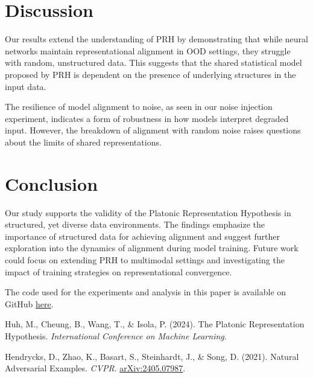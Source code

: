 \documentclass[10pt,a4paper]{article}
\begin{document}
\section{Discussion}
Our results extend the understanding of PRH by demonstrating that while neural networks maintain representational alignment in OOD settings, they struggle with random, unstructured data. This suggests that the shared statistical model proposed by PRH is dependent on the presence of underlying structures in the input data.

The resilience of model alignment to noise, as seen in our noise injection experiment, indicates a form of robustness in how models interpret degraded input. However, the breakdown of alignment with random noise raises questions about the limits of shared representations.



\section{Conclusion}
Our study supports the validity of the Platonic Representation Hypothesis in structured, yet diverse data environments. The findings emphasize the importance of structured data for achieving alignment and suggest further exploration into the dynamics of alignment during model training. Future work could focus on extending PRH to multimodal settings and investigating the impact of training strategies on representational convergence.

\vfill
The code used for the experiments and analysis in this paper is available on GitHub \href{https://github.com/rokosbasilisk/prh-experiments}{here}.

\clearpage
\begin{thebibliography}{9}

Huh, M., Cheung, B., Wang, T., \& Isola, P. (2024). The Platonic Representation Hypothesis. \emph{International Conference on Machine Learning}.

Hendrycks, D., Zhao, K., Basart, S., Steinhardt, J., \& Song, D. (2021). Natural Adversarial Examples. \emph{CVPR}. \href{https://arxiv.org/abs/2405.07987}{arXiv:2405.07987}.

\end{thebibliography}
\end{document}
